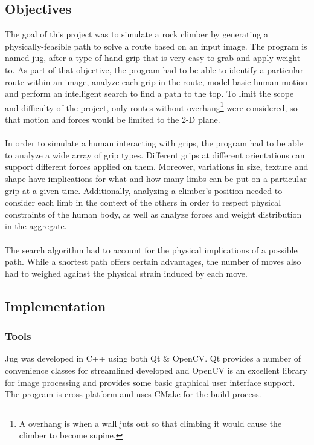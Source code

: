 \documentclass[pdftex,12pt]{article}
\theoremstyle{definition}
\theoremstyle{remark}
\begin{document}
\subsection*{Objectives}
The goal of this project was to simulate a rock climber by generating a physically-feasible path to solve a route based on an input image. The program is named jug, after a type of hand-grip that is very easy to grab and apply weight to. As part of that objective, the program had to be able to identify a particular route within an image, analyze each grip in the route, model basic human motion and perform an intelligent search to find a path to the top. To limit the scope and difficulty of the project, only routes without overhang\footnote{A overhang is when a wall juts out so that climbing it would cause the climber to become supine.} were considered, so that motion and forces would be limited to the 2-D plane. \\ \\
In order to simulate a human interacting with grips, the program had to be able to analyze a wide array of grip types. Different grips at different orientations can support different forces applied on them. Moreover, variations in size, texture and shape have implications for what and how many limbs can be put on a particular grip at a given time. Additionally, analyzing a climber's position needed to consider each limb in the context of the others in order to respect physical constraints of the human body, as well as analyze forces and weight distribution in the aggregate. \\ \\ 
The search algorithm had to account for the physical implications of a possible path. While a shortest path offers certain advantages, the number of moves also had to weighed against the physical strain induced by each move.

\subsection*{Implementation}
\subsubsection*{Tools}
Jug was developed in C++ using both Qt \& OpenCV. Qt provides a number of convenience classes for streamlined developed and OpenCV is an excellent library for image processing and provides some basic graphical user interface support. The program is cross-platform and uses CMake for the build process.
\end{document}
